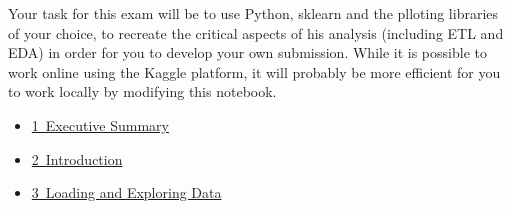 \documentclass[11pt]{article}
\providecommand{\tightlist}{%
      \setlength{\itemsep}{0pt}\setlength{\parskip}{0pt}}
\begin{document}
Your task for this exam will be to use Python, sklearn and the plloting
libraries of your choice, to recreate the critical aspects of his
analysis (including ETL and EDA) in order for you to develop your own
submission. While it is possible to work online using the Kaggle
platform, it will probably be more efficient for you to work locally by
modifying this notebook.

\begin{itemize}
\tightlist
\item
  \href{https://www.kaggleusercontent.com/kf/8446496/eyJhbGciOiJkaXIiLCJlbmMiOiJBMTI4Q0JDLUhTMjU2In0..yx1LRhBAm-wm19cxAYWP5Q.fN_74apmhjRiO6ZmO2PS4jLULz0TKwaEC4mhkrNBIaiS3MlsygfXo7Zd1ZT03iaMmh78YIANubqYCz5yI_5c6Xclq1FYaR_aUb8ND5btElxEYg0tb7_NkDHg-SHHVSsTlEhyET7eMeVoxj3LTS9-OtzfyNJh1DFk_Er5XfTEW9VbyDQh1FQ9-Ry7nBKZ6D1u.fCGn9rRQ12TP2wDfnPBJuw/__results__.html\#executive-summary}{1~Executive
  Summary}
\item
  \href{https://www.kaggleusercontent.com/kf/8446496/eyJhbGciOiJkaXIiLCJlbmMiOiJBMTI4Q0JDLUhTMjU2In0..yx1LRhBAm-wm19cxAYWP5Q.fN_74apmhjRiO6ZmO2PS4jLULz0TKwaEC4mhkrNBIaiS3MlsygfXo7Zd1ZT03iaMmh78YIANubqYCz5yI_5c6Xclq1FYaR_aUb8ND5btElxEYg0tb7_NkDHg-SHHVSsTlEhyET7eMeVoxj3LTS9-OtzfyNJh1DFk_Er5XfTEW9VbyDQh1FQ9-Ry7nBKZ6D1u.fCGn9rRQ12TP2wDfnPBJuw/__results__.html\#introduction}{2~Introduction}
\item
  \href{https://www.kaggleusercontent.com/kf/8446496/eyJhbGciOiJkaXIiLCJlbmMiOiJBMTI4Q0JDLUhTMjU2In0..yx1LRhBAm-wm19cxAYWP5Q.fN_74apmhjRiO6ZmO2PS4jLULz0TKwaEC4mhkrNBIaiS3MlsygfXo7Zd1ZT03iaMmh78YIANubqYCz5yI_5c6Xclq1FYaR_aUb8ND5btElxEYg0tb7_NkDHg-SHHVSsTlEhyET7eMeVoxj3LTS9-OtzfyNJh1DFk_Er5XfTEW9VbyDQh1FQ9-Ry7nBKZ6D1u.fCGn9rRQ12TP2wDfnPBJuw/__results__.html\#loading-and-exploring-data}{3~Loading
  and Exploring Data}


\end{itemize}
\end{document}

